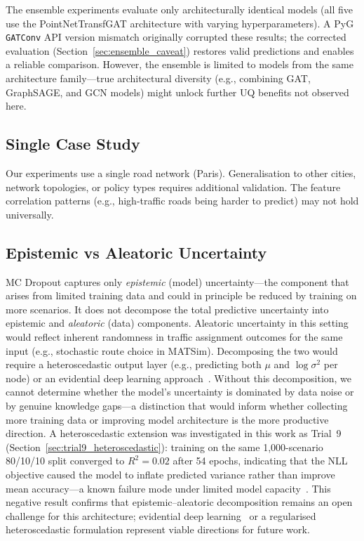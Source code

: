The ensemble experiments evaluate only architecturally identical models (all five use the PointNetTransfGAT architecture with varying hyperparameters).  A PyG \texttt{GATConv} API version mismatch originally corrupted these results; the corrected evaluation (Section~\ref{sec:ensemble_caveat}) restores valid predictions and enables a reliable comparison.  However, the ensemble is limited to models from the same architecture family---true architectural diversity (e.g., combining GAT, GraphSAGE, and GCN models) might unlock further UQ benefits not observed here.

\subsection{Single Case Study}

Our experiments use a single road network (Paris). Generalisation to other cities, network topologies, or policy types requires additional validation. The feature correlation patterns (e.g., high-traffic roads being harder to predict) may not hold universally.

\subsection{Epistemic vs Aleatoric Uncertainty}\label{sec:limitations_epistemic}

MC Dropout captures only \emph{epistemic} (model) uncertainty---the component that arises from limited training data and could in principle be reduced by training on more scenarios. It does not decompose the total predictive uncertainty into epistemic and \emph{aleatoric} (data) components. Aleatoric uncertainty in this setting would reflect inherent randomness in traffic assignment outcomes for the same input (e.g., stochastic route choice in MATSim). Decomposing the two would require a heteroscedastic output layer (e.g., predicting both $\mu$ and $\log\sigma^2$ per node) or an evidential deep learning approach~\cite{amini2020deep}. Without this decomposition, we cannot determine whether the model's uncertainty is dominated by data noise or by genuine knowledge gaps---a distinction that would inform whether collecting more training data or improving model architecture is the more productive direction. A heteroscedastic extension was investigated in this work as Trial~9 (Section~\ref{sec:trial9_heteroscedastic}): training on the same 1,000-scenario 80/10/10 split converged to $R^2 = 0.02$ after 54 epochs, indicating that the NLL objective caused the model to inflate predicted variance rather than improve mean accuracy---a known failure mode under limited model capacity~\cite{seitzer2022pitfalls}. This negative result confirms that epistemic--aleatoric decomposition remains an open challenge for this architecture; evidential deep learning~\cite{amini2020deep} or a regularised heteroscedastic formulation represent viable directions for future work.


